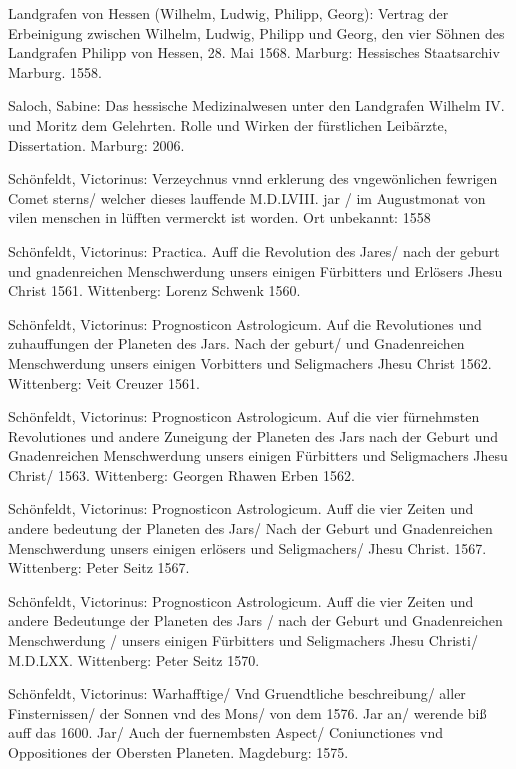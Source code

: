 \documentclass[12pt]{article}
\begin{document}
\begin{thebibliography}{}
 Landgrafen von Hessen (Wilhelm, Ludwig, Philipp, Georg): Vertrag der Erbeinigung zwischen Wilhelm, Ludwig, Philipp und Georg, den vier Söhnen des Landgrafen Philipp von Hessen, 28. Mai 1568. Marburg: Hessisches Staatsarchiv Marburg. 1558.

 Saloch, Sabine: Das hessische Medizinalwesen unter den Landgrafen Wilhelm IV. und Moritz dem Gelehrten. Rolle und Wirken der fürstlichen Leibärzte, Dissertation. Marburg: 2006.

 Schönfeldt, Victorinus: Verzeychnus vnnd erklerung des vngewönlichen fewrigen Comet sterns/ welcher dieses lauffende M.D.LVIII. jar / im Augustmonat von vilen menschen in lüfften vermerckt ist worden. Ort unbekannt: 1558

 Schönfeldt, Victorinus: Practica. Auff die Revolution des Jares/ nach der geburt und gnadenreichen Menschwerdung unsers einigen Fürbitters und Erlösers Jhesu Christ 1561. Wittenberg: Lorenz Schwenk 1560. 	

 Schönfeldt, Victorinus: Prognosticon Astrologicum. Auf die Revolutiones und zuhauffungen der Planeten des Jars. Nach der geburt/ und Gnadenreichen Menschwerdung unsers einigen Vorbitters und Seligmachers Jhesu Christ 1562. Wittenberg: Veit Creuzer 1561. 	

 Schönfeldt, Victorinus: Prognosticon Astrologicum. Auf die vier fürnehmsten Revolutiones und andere Zuneigung der Planeten des Jars nach der Geburt und Gnadenreichen Menschwerdung unsers einigen Fürbitters und Seligmachers Jhesu Christ/ 1563. Wittenberg: Georgen Rhawen Erben 1562. 	

 Schönfeldt, Victorinus: Prognosticon Astrologicum. Auff die vier Zeiten und andere bedeutung der Planeten des Jars/ Nach der Geburt und Gnadenreichen Menschwerdung unsers einigen erlösers und Seligmachers/ Jhesu Christ. 1567. Wittenberg: Peter Seitz 1567. 	

 Schönfeldt, Victorinus: Prognosticon Astrologicum. Auff die vier Zeiten und andere Bedeutunge der Planeten des Jars / nach der Geburt und Gnadenreichen Menschwerdung / unsers einigen Fürbitters und Seligmachers Jhesu Christi/ M.D.LXX. Wittenberg: Peter Seitz 1570. 	

 Schönfeldt, Victorinus:
Warhafftige/ Vnd Gruendtliche beschreibung/ aller Finsternissen/ der Sonnen vnd des Mons/ von dem 1576. Jar an/ werende biß auff das 1600. Jar/ Auch der fuernembsten Aspect/ Coniunctiones vnd Oppositiones der Obersten Planeten. Magdeburg: 1575.


\end{thebibliography}
\end{document}
